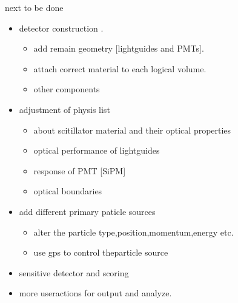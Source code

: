 \documentclass[11pt,compress,xcolor=x11names,UTF8]{beamer}
\begin{document}
\begin{frame}{next to be done}
\begin{itemize}
\item detector construction \alert{.}
\begin{itemize}
\item add remain geometry [lightguides and PMTs].
\item attach correct material to each logical volume.
\item other components
\end{itemize}
\item adjustment of physis list 
\begin{itemize}
\item  about scitillator material and their \alert{optical properties}
\item  optical performance of lightguides
\item  response of PMT [SiPM]
\item optical boundaries
\end{itemize}

\item add different primary \alert{paticle sources}\\
\begin{itemize}
\item alter the particle type,position,momentum,energy etc.\\
\item  use gps to control theparticle source
\end{itemize}
\item sensitive detector and scoring 
\item more useractions for output and analyze.
\end{itemize}
\end{frame}
\end{document}
